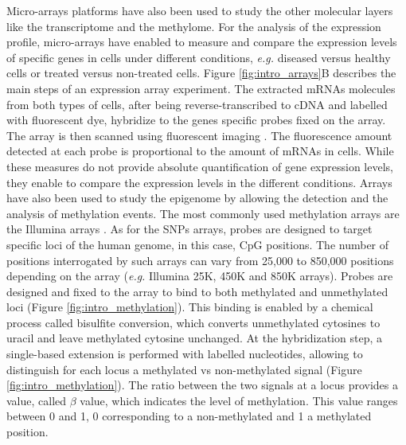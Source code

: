 Micro-arrays platforms have also been used to study the other molecular layers like the transcriptome and the methylome. For the analysis of the expression profile, micro-arrays have enabled to measure and compare the expression levels of specific genes in cells under different conditions, \textit{e.g.} diseased versus healthy cells or treated versus non-treated cells. Figure \ref{fig:intro_arrays}B describes the main steps of an expression array experiment. The extracted \gls{mRNAs} molecules from both types of cells, after being reverse-transcribed to \gls{cDNA} and labelled with fluorescent dye, hybridize to the genes specific probes fixed on the array. The array is then scanned using fluorescent imaging \cite{Tarca2006}. The fluorescence amount detected at each probe is proportional to the amount of \gls{mRNAs} in cells. While these measures do not provide absolute quantification of gene expression levels, they enable to compare the expression levels in the different conditions.
Arrays have also been used to study the epigenome by allowing the detection and the analysis of methylation events. The most commonly used methylation arrays are the Illumina arrays \cite{Illumina_Methylation_infinium}. As for the \gls*{SNP}s arrays, probes are designed to target specific loci of the human genome, in this case, \gls{CpG} positions. The number of positions interrogated by such arrays can vary from 25,000 to 850,000 positions depending on the array (\textit{e.g.} Illumina 25K, 450K and 850K arrays). Probes are designed and fixed to the array to bind to both methylated and unmethylated loci (Figure \ref{fig:intro_methylation}). This binding is enabled by a chemical process called bisulfite conversion, which converts unmethylated cytosines to uracil and leave methylated cytosine unchanged. At the hybridization step, a single-based extension is performed with labelled nucleotides, allowing to distinguish for each locus a methylated vs non-methylated signal (Figure \ref{fig:intro_methylation}). The ratio between the two signals at a locus provides a value, called $\beta$ value, which indicates the level of methylation. This value ranges between 0 and 1, 0 corresponding to a non-methylated and 1 a methylated position. 
